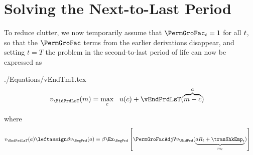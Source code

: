 \documentclass[SolvingMicroDSOPs]{subfiles}
\begin{document}
\hypertarget{solving-the-next-to-last-period}{}
\hypertarget{solving-the-next}{}
\section{Solving the Next-to-Last Period}\label{sec:solving-the-next}

To reduce clutter, we now temporarily assume that $\PermGroFac_{\prd}=1$ for all $t$, so that the $\PermGroFac$ terms from the earlier derivations disappear, and setting $t=T$ the problem in the second-to-last period of life can now be expressed as
\begin{verbatimwrite}{./Equations/vEndTm1.tex}
\begin{equation}\begin{gathered}\begin{aligned}
  \vFunc_{\MidPrdLsT}(\mNrm)  & = \max_{\cNrm} ~~ \uFunc(\cNrm) +
                              \vEndPrdLsT(\overbrace{\mNrm-\cNrm}^{\aNrm})
                              \label{eq:vEndTm1}
\end{aligned}\end{gathered}\end{equation}
\end{verbatimwrite}
\unskip
where 
\begin{equation*}\begin{gathered}\begin{aligned}
  \vFunc_{\EndPrdLsT}(\aNrm)  & \leftassign \DiscFac \vFunc_{\BegPrd}(\aNrm) 
                           \equiv \DiscFac \Ex_{\BegPrd} \left[\PermGroFacAdjV \vFunc_{\MidPrd}(\underbrace{\aNrm \RNrm_{\prdT} + \tranShkEmp_{\prdT}}_{{m}_{\prdT}})\right]
    \end{aligned}\end{gathered}\end{equation*}

\end{document}
